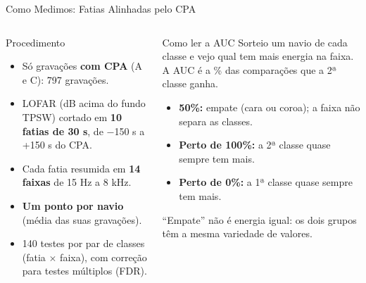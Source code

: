 \documentclass[aspectratio=169]{beamer}
\begin{document}
\begin{frame}{Como Medimos: Fatias Alinhadas pelo CPA}
    \footnotesize
    \begin{columns}[t]
        \begin{block}{\small Procedimento}
            \scriptsize
            \begin{itemize}
                \setlength{\itemsep}{2pt}
                \item Só gravações \textbf{com CPA} (A e C): 797 gravações.
                \item LOFAR (dB acima do fundo TPSW) cortado em \textbf{10 fatias de 30 s}, de $-$150 s a +150 s do CPA.
                \item Cada fatia resumida em \textbf{14 faixas} de 15 Hz a 8 kHz.
                \item \textbf{Um ponto por navio} (média das suas gravações).
                \item 140 testes por par de classes (fatia $\times$ faixa), com correção para testes múltiplos (FDR).
            \end{itemize}
        \end{block}
        \begin{block}{\small Como ler a AUC}
            \scriptsize
            Sorteio um navio de cada classe e vejo qual tem mais energia na faixa. A AUC é a \% das comparações que a 2ª classe ganha.
            \begin{itemize}
                \setlength{\itemsep}{1pt}
                \item \textbf{50\%:} empate (cara ou coroa); a faixa não separa as classes.
                \item \textbf{Perto de 100\%:} a 2ª classe quase sempre tem mais.
                \item \textbf{Perto de 0\%:} a 1ª classe quase sempre tem mais.
            \end{itemize}
            ``Empate'' não é energia igual: os dois grupos têm a mesma variedade de valores.
        \end{block}
    \end{columns}
\end{frame}
\end{document}
